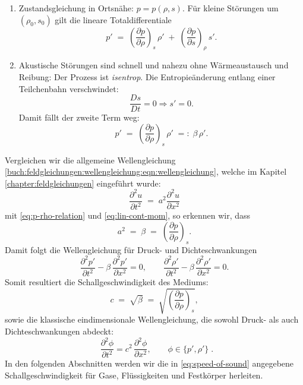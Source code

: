 \begin{enumerate}
\item Zustandsgleichung in Ortsnähe: $p=p(\rho,s)$.
      Für kleine Störungen um $(\rho_0,s_0)$ gilt die lineare Totaldifferentiale
      \[
        p' \;=\; \left(\frac{\partial p}{\partial \rho}\right)_{s}\,\rho'
             \;+\; \left(\frac{\partial p}{\partial s}\right)_{\rho}\,s'.
      \]
\item Akustische Störungen sind schnell und nahezu ohne Wärmeaustausch
      und Reibung: Der Prozess ist \emph{isentrop}.
      Die Entropieänderung entlang einer Teilchenbahn verschwindet:
      \[
        \frac{Ds}{Dt}=0
        \Rightarrow s'=0.
      \]
      Damit fällt der zweite Term weg:
      \begin{equation}
        p' \;=\; \left(\frac{\partial p}{\partial \rho}\right)_{s}\,\rho' \;=:\; \beta\,\rho'.
        \label{eq:p-rho-relation}
      \end{equation}
\end{enumerate}
Vergleichen wir die allgemeine Wellengleichung \eqref{buch:feldgleichungen:wellengleichung:eqn:wellengleichung},
welche im Kapitel \ref{chapter:feldgleichungen} eingeführt wurde:
\[
    \frac{\partial^2 u}{\partial t^2} \;=\;a^2 \frac{\partial^2 u}{\partial x^2}
\]
mit \eqref{eq:p-rho-relation} und \eqref{eq:lin-cont-mom}, so erkennen wir, dass
\[    a^2 \;=\; \beta \;=\; \left(\frac{\partial p}{\partial \rho}\right)_{s}.\]
Damit folgt die Wellengleichung für Druck- und Dichteschwankungen
\begin{equation}
    \frac{\partial^2 p'}{\partial t^2} - \beta\,\frac{\partial^2 p'}{\partial x^2} = 0,
    \qquad
    \frac{\partial^2 \rho'}{\partial t^2} - \beta\,\frac{\partial^2 \rho'}{\partial x^2} = 0.
    \label{eq:wave-equation-p-rho}
\end{equation}
Somit resultiert die Schallgeschwindigkeit des Mediums:
\begin{equation}
    c \;=\; \sqrt{\beta} \;=\; \sqrt{\left(\frac{\partial p}{\partial \rho}\right)_{s}},
    \label{eq:speed-of-sound}
\end{equation}
sowie die klassische eindimensionale Wellengleichung, die sowohl
Druck- als auch Dichteschwankungen abdeckt:
\begin{equation}
    \;\;\frac{\partial^2 \phi}{\partial t^2} = c^2\,
    \frac{\partial^2 \phi}{\partial x^2}, \qquad \phi\in\{p',\rho'\}\; .
    \label{eq:1d-wave-equation}
\end{equation}
In den folgenden Abschnitten werden wir die in \eqref{eq:speed-of-sound}
angegebene Schallgeschwindigkeit für Gase, Flüssigkeiten und Festkörper
herleiten.

